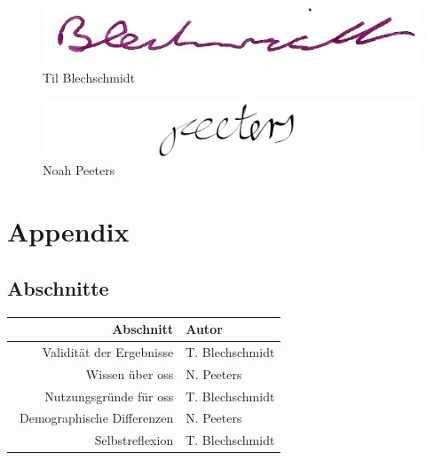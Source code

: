 \documentclass[a4paper]{article}
\begin{document}
        
        \begin{figure}[H]
            \centering
            \begin{minipage}{.5\textwidth}
                \centering
                \includegraphics[width=\textwidth]{assets/signature_tilb.png}
                Til Blechschmidt
            \end{minipage}%
            \begin{minipage}{.5\textwidth}
                \centering
                \includegraphics[width=\textwidth]{assets/signature_noahp.png}
                Noah Peeters
            \end{minipage}
        \end{figure}
        \clearpage
    
    \clearpage
    \section{Appendix}
        \printglossary[type=\acronymtype]
        \printglossary
        
        
        
        
        \clearpage
        
        \subsection{Abschnitte}
            \begin{tabular}{r | l}
              Abschnitt & Autor \\
              \hline
              Validität der Ergebnisse & T. Blechschmidt\\
              Wissen über \gls{oss} & N. Peeters\\
              Nutzungsgründe für \gls{oss} & T. Blechschmidt\\\
              Demographische Differenzen & N. Peeters\\
              Selbstreflexion & T. Blechschmidt
            \end{tabular}
        
\end{document}
